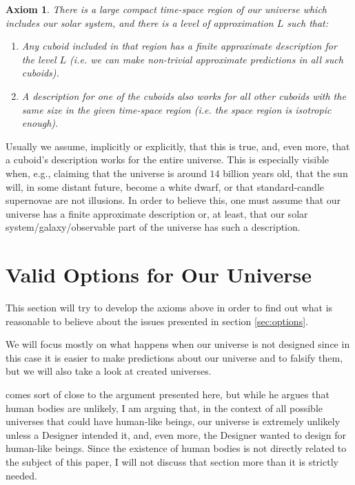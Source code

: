 \documentclass[a4paper
,draft
]{article}
\newcommand{\paper}[1]{paper}
\newcommand{\ghilimele}[1]{``#1"}
\newtheorem{axiom}{Axiom}
\begin{document}
\begin{axiom}\label{ax:finiteneighbourhood}
  There is a large compact time-space region of our universe which
  includes our solar
  system, and there is a level of approximation $L$ such that:
  \begin{enumerate}
    \item Any cuboid included in that region has a finite approximate
          description for the level $L$ (i.e. we can make non-trivial
          approximate predictions in all such cuboids).
    \item A description for one of the cuboids also works for all other
          cuboids with the same size in the given time-space region
          (i.e. the space region is isotropic enough).
  \end{enumerate}
\end{axiom}

Usually we assume, implicitly or explicitly,
that this is true, and, even more, that a cuboid's description works
for the entire universe.
This is especially visible when, e.g., claiming
that the universe is around $14$ billion years old, that the sun will,
in some distant future, become a white dwarf, or that standard-candle supernovae
are not illusions.
In order to believe this, one must assume that our universe has a
finite approximate description or, at least, that our
solar system/galaxy/observable part of the universe has such a description.

\section{Valid Options for Our Universe}
\label{sec:valid-options}

This section will try to develop the axioms above in order to find out what
is reasonable to believe about the issues presented in
section \ref{sec:options}.

We will focus mostly on what happens when our universe is not designed
since in this case it is easier to make predictions about our universe
and to falsify them, but we will also take a look at created universes.

\textcite[][Section \ghilimele{Why a world with human bodies is unlikely
if there is no God}]{Swinburne2003} comes sort of close to the argument
presented here, but while he
argues that human bodies are unlikely, I am arguing that, in the context
of all possible universes that could have human-like beings,
our universe is extremely unlikely unless a Designer intended it,
and, even more, the Designer wanted to design for human-like
beings.
Since the existence of human bodies is not directly related to the subject
of this \paper{}, I will not discuss that section more
than it is strictly needed.
\end{document}
